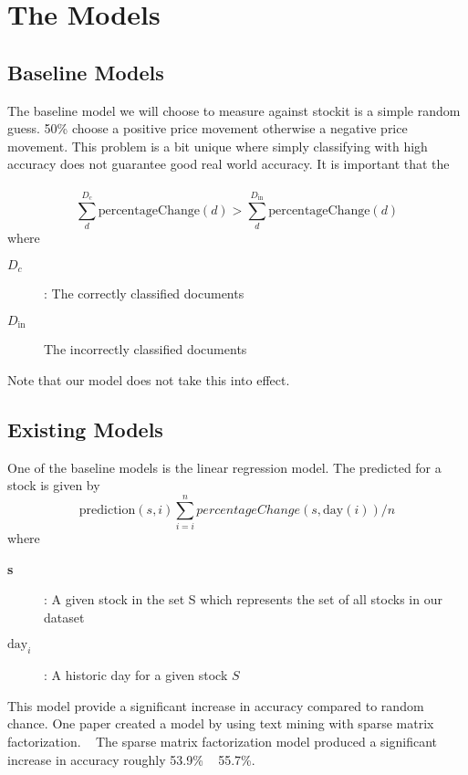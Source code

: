 \documentclass[11pt,letterpaper]{article}
\newcommand{\blue}[1]{\textcolor{RoyalBlue}{#1}}
\newcommand{\instructions}[1]{\blue{\textit{#1}}}
\begin{document}
\section{The Models}
\label{sec:models}

\subsection{Baseline Models}
\label{sec:baseline-models}
The baseline model we will choose to measure against stockit is a simple random guess.
50\% choose a positive price movement otherwise a negative price movement. This problem is a bit unique
where simply classifying with high accuracy does not guarantee good real world accuracy. It is important that the \\ \\
\begin{equation}\label{acc:constraint}
	\sum_{d}^{D_c} \text{percentageChange}(d) > \sum_{d}^{D_{\text{in}}} \text{percentageChange}(d)
\end{equation}
where
\begin{description}
	\item[\textbf{\(D_c\)}] : The correctly classified documents
	\item[\textbf{\(D_{\text{in}}\)}] The incorrectly classified documents
\end{description}
Note that our model does not take this into effect.

\subsection{Existing Models}
\label{sec:existing-models}
One of the baseline models is the linear regression model. The predicted for a stock is given by
\begin{equation}\label{pred:uniform}
	\text{prediction}(s, i) \sum_{i=i}^{n} percentageChange(s, \text{day}(i)) / n
\end{equation}
where
\begin{description}
	\item[\textbf{s}] : A given stock in the set S which represents the set of all stocks in our dataset
	\item[\textbf{\(\text{day}_i\)}] : A historic day for a given stock \(S\) 
\end{description}
This model provide a significant increase in accuracy compared to random chance.
One paper created a model by using text mining with sparse matrix factorization. ~\cite{stock-matrix}
The sparse matrix factorization model produced a significant increase in accuracy roughly 53.9\% ~ 55.7\%.
\end{document}
